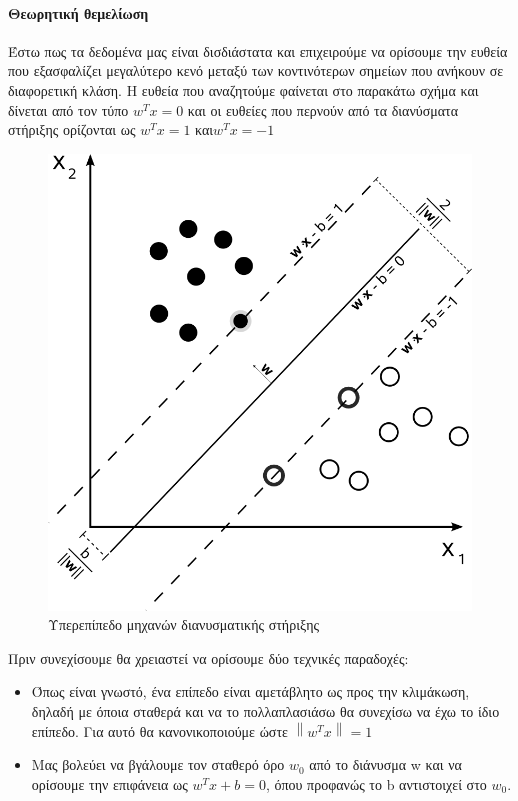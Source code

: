 \documentclass{article}
\newcommand{\norm}[1]{\left\lVert#1\right\rVert}
\begin{document}
\paragraph{Θεωρητική θεμελίωση} Έστω πως τα δεδομένα μας είναι δισδιάστατα και επιχειρούμε να ορίσουμε την ευθεία που εξασφαλίζει μεγαλύτερο κενό μεταξύ των κοντινότερων σημείων που ανήκουν σε διαφορετική κλάση. Η ευθεία που αναζητούμε φαίνεται στο παρακάτω σχήμα και δίνεται από τον τύπο $w^T x = 0$ και οι ευθείες που περνούν από τα διανύσματα στήριξης ορίζονται ως $w^T x = 1$ και$ w^T x =-1$
\begin{figure}[H]
	\centering			
    \includegraphics[scale=0.2]{svm.png}
    \caption[Υπερεπίπεδο μηχανών διανυσματικής στήριξης]{Υπερεπίπεδο μηχανών διανυσματικής στήριξης}
 \end{figure}
 Πριν συνεχίσουμε θα χρειαστεί να ορίσουμε δύο τεχνικές παραδοχές:
 \begin{itemize}
 \item Όπως είναι γνωστό, ένα επίπεδο είναι αμετάβλητο ως προς την κλιμάκωση, δηλαδή με όποια σταθερά και να το πολλαπλασιάσω θα συνεχίσω να έχω το ίδιο επίπεδο. Για αυτό θα κανονικοποιούμε ώστε $\norm{w^T x}=1$
 \item  Μας βολεύει να βγάλουμε τον σταθερό όρο $w_0$ από το διάνυσμα w και να ορίσουμε την επιφάνεια ως $w^T  x + b = 0$, όπου προφανώς το b αντιστοιχεί στο $w_0$.

 \end{itemize}
 
\end{document}
